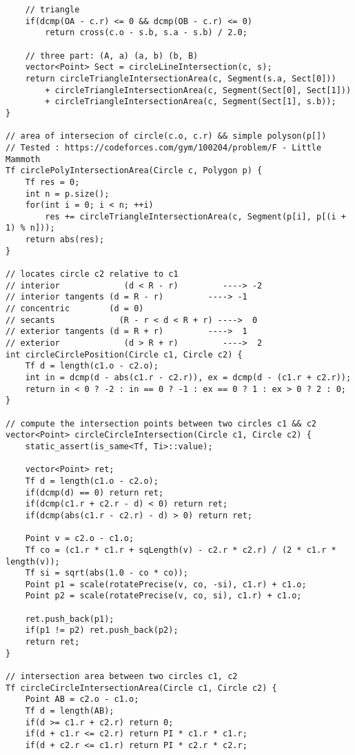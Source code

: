 \documentclass[FSZ,a4paper,onesided]{article}
\begin{document}
\begin{multicols*}{\COLS}
\begin{lstlisting}
    // triangle
    if(dcmp(OA - c.r) <= 0 && dcmp(OB - c.r) <= 0)
        return cross(c.o - s.b, s.a - s.b) / 2.0;

    // three part: (A, a) (a, b) (b, B)
    vector<Point> Sect = circleLineIntersection(c, s);
    return circleTriangleIntersectionArea(c, Segment(s.a, Sect[0]))
        + circleTriangleIntersectionArea(c, Segment(Sect[0], Sect[1]))
        + circleTriangleIntersectionArea(c, Segment(Sect[1], s.b));
}

// area of intersecion of circle(c.o, c.r) && simple polyson(p[])
// Tested : https://codeforces.com/gym/100204/problem/F - Little Mammoth
Tf circlePolyIntersectionArea(Circle c, Polygon p) {
    Tf res = 0;
    int n = p.size();
    for(int i = 0; i < n; ++i)
        res += circleTriangleIntersectionArea(c, Segment(p[i], p[(i + 1) % n]));
    return abs(res);
}

// locates circle c2 relative to c1
// interior             (d < R - r)         ----> -2
// interior tangents (d = R - r)         ----> -1
// concentric        (d = 0)
// secants             (R - r < d < R + r) ---->  0
// exterior tangents (d = R + r)         ---->  1
// exterior             (d > R + r)         ---->  2
int circleCirclePosition(Circle c1, Circle c2) {
    Tf d = length(c1.o - c2.o);
    int in = dcmp(d - abs(c1.r - c2.r)), ex = dcmp(d - (c1.r + c2.r));
    return in < 0 ? -2 : in == 0 ? -1 : ex == 0 ? 1 : ex > 0 ? 2 : 0;
}

// compute the intersection points between two circles c1 && c2
vector<Point> circleCircleIntersection(Circle c1, Circle c2) {
    static_assert(is_same<Tf, Ti>::value);

    vector<Point> ret;
    Tf d = length(c1.o - c2.o);
    if(dcmp(d) == 0) return ret;
    if(dcmp(c1.r + c2.r - d) < 0) return ret;
    if(dcmp(abs(c1.r - c2.r) - d) > 0) return ret;

    Point v = c2.o - c1.o;
    Tf co = (c1.r * c1.r + sqLength(v) - c2.r * c2.r) / (2 * c1.r * length(v));
    Tf si = sqrt(abs(1.0 - co * co));
    Point p1 = scale(rotatePrecise(v, co, -si), c1.r) + c1.o;
    Point p2 = scale(rotatePrecise(v, co, si), c1.r) + c1.o;

    ret.push_back(p1);
    if(p1 != p2) ret.push_back(p2);
    return ret;
}

// intersection area between two circles c1, c2
Tf circleCircleIntersectionArea(Circle c1, Circle c2) {
    Point AB = c2.o - c1.o;
    Tf d = length(AB);
    if(d >= c1.r + c2.r) return 0;
    if(d + c1.r <= c2.r) return PI * c1.r * c1.r;
    if(d + c2.r <= c1.r) return PI * c2.r * c2.r;


\end{lstlisting}
\end{multicols*}
\end{document}
